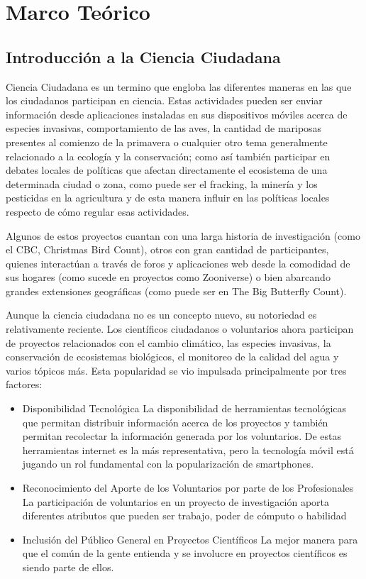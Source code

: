 \chapter{Marco Teórico}
		
	
\section{Introducción a la Ciencia Ciudadana}
    
    Ciencia Ciudadana es un termino que engloba las diferentes maneras en las que los ciudadanos participan en ciencia. Estas actividades pueden ser enviar información desde aplicaciones instaladas en sus dispositivos móviles acerca de especies invasivas, comportamiento de las aves, la cantidad de mariposas presentes al comienzo de la primavera o cualquier otro tema generalmente relacionado a la ecología y la conservación; como así también participar en debates locales de políticas que afectan directamente el ecosistema de una determinada ciudad o zona, como puede ser el fracking, la minería y los pesticidas en la agricultura y de esta manera influir en las políticas locales respecto de cómo regular esas actividades.\cite{envCitizenScience}
    
	Algunos de estos proyectos cuantan con una larga historia de investigación (como el CBC, Christmas Bird Count), otros con gran cantidad de participantes, quienes interactúan a través de foros y aplicaciones web desde la comodidad de sus hogares (como sucede en proyectos como Zooniverse) o bien abarcando grandes extensiones geográficas (como puede ser en The Big Butterfly Count). \cite{shirk2012public} 
		
	Aunque la ciencia ciudadana no es un concepto nuevo, su notoriedad es relativamente reciente. Los científicos ciudadanos o voluntarios ahora participan de proyectos relacionados con el cambio climático, las especies invasivas, la conservación de ecosistemas biológicos, el monitoreo de la calidad del agua y varios tópicos más. Esta popularidad se vio impulsada principalmente por tres factores:

\begin{itemize}
	\item {Disponibilidad Tecnológica}
	La disponibilidad de herramientas tecnológicas que permitan distribuir información acerca de los proyectos y también permitan recolectar la información generada por los voluntarios. De estas herramientas internet es la más representativa, pero la tecnología móvil está jugando un rol fundamental con la popularización de smartphones. \cite{silvertown2009new}
	\item {Reconocimiento del Aporte de los Voluntarios por parte de los Profesionales}
	La participación de voluntarios en un proyecto de investigación aporta diferentes atributos que pueden ser trabajo, poder de cómputo o habilidad \cite{cohn2008citizen}
	\item {Inclusión del Público General en Proyectos Científicos}
	La mejor manera para que el común de la gente entienda y se involucre en proyectos científicos es siendo parte de ellos. \cite{silvertown2009new}
\end{itemize} 


